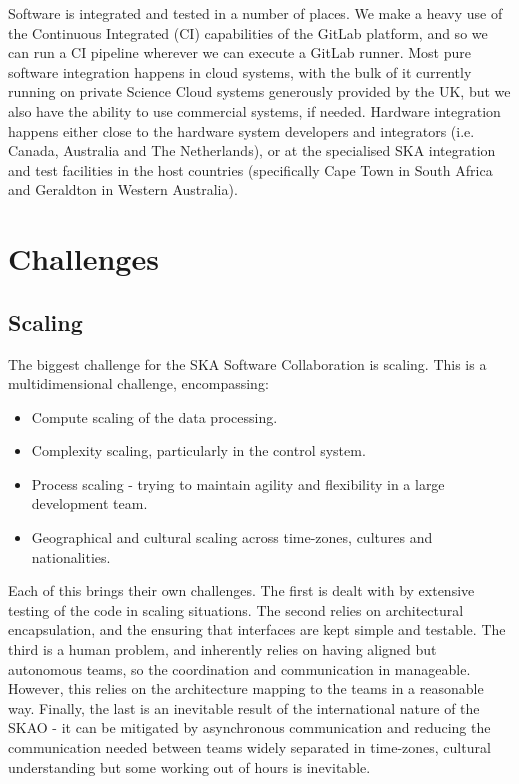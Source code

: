 \documentclass[a4paper,
               biblatex,     %
               keeplastbox,   %
               ]{jacow}
\begin{document}
Software is integrated and tested in a number of places. We make a heavy use of the Continuous Integrated (CI) capabilities of the GitLab platform, and so we can run a CI pipeline wherever we can execute a GitLab runner. Most pure software integration happens in cloud systems, with the bulk of it currently running on private Science Cloud systems generously provided by the UK, but we also have the ability to use commercial systems, if needed. Hardware integration happens either close to the hardware system developers and integrators (i.e. Canada, Australia and The Netherlands), or at the specialised SKA integration and test facilities in the host countries (specifically Cape Town in South Africa and Geraldton in Western Australia).




\section{Challenges}
\subsection{Scaling}
The biggest challenge for the SKA Software Collaboration is scaling. This is a multidimensional challenge, encompassing:
\begin{itemize}
	\item Compute scaling of the data processing.
	\item Complexity scaling, particularly in the control system.
	\item Process scaling - trying to maintain agility and flexibility in a large development team.
	\item Geographical and cultural scaling across time-zones, cultures and nationalities.
\end{itemize}
Each of this brings their own challenges. The first is dealt with by extensive testing of the code in scaling situations. The second relies on architectural encapsulation, and the ensuring that interfaces are kept simple and testable. The third is a human problem, and inherently relies on having aligned but autonomous teams, so the coordination and communication in manageable. However, this relies on the architecture mapping to the teams in a reasonable way. Finally, the last is an inevitable result of the international nature of the SKAO - it can be mitigated by asynchronous communication and reducing the communication needed between teams widely separated in time-zones, cultural understanding but some working out of hours is inevitable.
\end{document}
